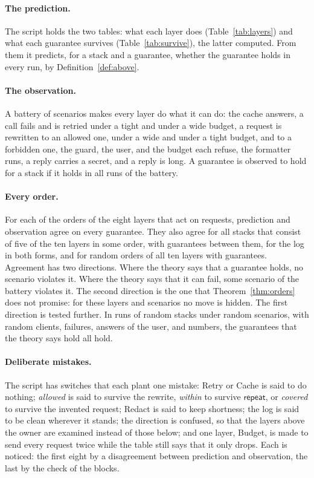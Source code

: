 \documentclass[acmsmall,nonacm,screen]{acmart}
\newcommand{\kw}[1]{\mathsf{#1}}
\newcommand{\ly}[1]{\textsf{#1}}
\newcommand{\rep}{\kw{repeat}}
\newcommand{\claim}[2]{#2}
\begin{document}
\paragraph{The prediction.} The script holds the two tables: what each layer does
(Table~\ref{tab:layers}) and what each guarantee survives (Table~\ref{tab:survive}), the
latter computed. From them it predicts, for a stack and a guarantee, whether the guarantee
holds in every run, by Definition~\ref{def:above}.

\paragraph{The observation.} A battery of \exBattery{} scenarios makes every layer do what
it can do: the cache answers, a call fails and is retried under a tight and under a wide
budget, a request is rewritten to an allowed one, under a wide and under a tight budget, and to a
forbidden one, the guard, the user,
and the budget each refuse, the formatter runs, a reply carries a secret, and a reply is
long. A guarantee is observed to hold for a stack if it holds in all runs of the battery.

\paragraph{Every order.} \claim{eight-agree}{For each of the \exEightOrders{} orders of the
eight layers that act on requests, prediction and observation agree on every guarantee.}
\claim{fives-agree}{They also agree for all \exFives{} stacks that consist of five of the
ten layers in some order, with \exFiveGuarantees{} guarantees between them, for the log in
both forms, and for \exTens{} random orders of all ten layers with \exTenGuarantees{}
guarantees.} Agreement has two directions. Where the theory says that a guarantee holds, no
scenario violates it. Where the theory says that it can fail, some scenario of the battery
violates it. The second direction is the one that Theorem~\ref{thm:orders} does not promise:
for these layers and scenarios no move is hidden. The first direction is tested further.
\claim{sound}{In \exSoundRuns{} runs of random stacks under random scenarios, with random
clients, failures, answers of the user, and numbers, the \exKept{} guarantees that the
theory says hold all hold.}

\paragraph{Deliberate mistakes.} The script has \exMutants{} switches that each plant one
mistake: \ly{Retry} or \ly{Cache} is said to do nothing; \emph{allowed} is said to survive
the rewrite, \emph{within} to survive $\rep$, or \emph{covered} to survive the invented
request; \ly{Redact} is said to keep shortness; the log is said to be clean wherever it
stands; the direction is confused, so that the layers above the owner are examined instead
of those below; and one layer, \ly{Budget}, is made to send every request twice while the
table still says that it only drops. \claim{all-noticed}{Each is noticed}: the first eight
by a disagreement between prediction and observation, the last by the check of the blocks.
\end{document}

